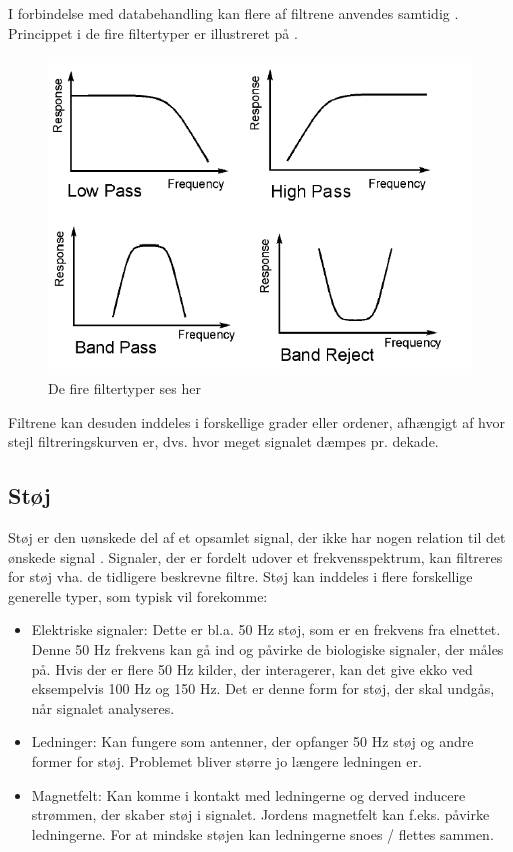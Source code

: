 I forbindelse med databehandling kan flere af filtrene anvendes samtidig \cite{Devasahayam2000}. Princippet i de fire filtertyper er illustreret på .
\begin{figure}[H]
\centering
\includegraphics[scale=0.8]{figures/bproblemanalyse/filtertyper.png}
\caption{De fire filtertyper ses her \cite{2. semester kristian}}
\label{filtertyper}
\end{figure}
Filtrene kan desuden inddeles i forskellige grader eller ordener, afhængigt af hvor stejl filtreringskurven er, dvs. hvor meget signalet dæmpes pr. dekade\cite{2. semester kristian}.

\subsection{Støj}
Støj er den uønskede del af et opsamlet signal, der ikke har nogen relation til det ønskede signal . Signaler, der er fordelt udover et frekvensspektrum, kan filtreres for støj vha. de tidligere beskrevne filtre. \cite{Devasahayam2000}
Støj kan inddeles i flere forskellige generelle typer, som typisk vil forekomme:

\begin{itemize}
\item Elektriske signaler: Dette er bl.a. 50 Hz støj, som er en frekvens fra elnettet. Denne 50 Hz frekvens kan gå ind og påvirke de biologiske signaler, der måles på. Hvis der er flere 50 Hz kilder, der interagerer, kan det give ekko ved eksempelvis 100 Hz og 150 Hz. Det er denne form for støj, der skal undgås, når signalet analyseres.
\item Ledninger: Kan fungere som antenner, der opfanger 50 Hz støj og andre former for støj. Problemet bliver større jo længere ledningen er. 
\item Magnetfelt: Kan komme i kontakt med ledningerne og derved inducere strømmen, der skaber støj i signalet. Jordens magnetfelt kan f.eks. påvirke ledningerne. For at mindske støjen kan ledningerne snoes / flettes sammen.
\end{itemize} 
